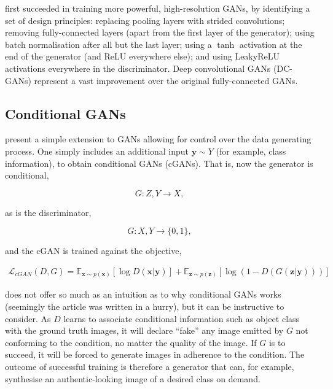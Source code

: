 \cite{radford2015unsupervised} first succeeded in training more powerful, high-resolution GANs, by identifying a set of design principles: replacing pooling layers with strided convolutions; removing fully-connected layers (apart from the first layer of the generator); using batch normalisation after all but the last layer; using a $\tanh$ activation at the end of the generator (and ReLU everywhere else); and using LeakyReLU activations everywhere in the discriminator. Deep convolutional GANs (DC-GANs) represent a vast improvement over the original fully-connected GANs.

\subsection{Conditional GANs}

\cite{mirza2014conditional} present a simple extension to GANs allowing for control over the data generating process. One simply includes an additional input $\mathbf{y} \sim Y$ (for example, class information), to obtain conditional GANs (cGANs). That is, now the generator is conditional,

\begin{equation}
G : Z, Y \to X,
\end{equation}

as is the discriminator,

\begin{equation}
G : X, Y \to \{0, 1\},
\end{equation}

and the cGAN is trained against the objective,

\begin{align}\mathcal{L}_{cGAN}(D, G) = \mathbb{E}_{\mathbf{x} \sim p(\mathbf{x})}[\log D(\mathbf{x} | \mathbf{y})] + \mathbb{E}_{\mathbf{z} \sim p(\mathbf{z})}[\log(1 - D(G(\mathbf{z} | \mathbf{y})))]
\end{align}

\cite{mirza2014conditional} does not offer so much as an intuition as to why conditional GANs works (seemingly the article was written in a hurry), but it can be instructive to consider. As $D$ learns to associate conditional information such as object class with the ground truth images, it will declare ``fake'' any image emitted by $G$ not conforming to the condition, no matter the quality of the image. If $G$ is to succeed, it will be forced to generate images in adherence to the condition. The outcome of successful training is therefore a generator that can, for example, synthesise an authentic-looking image of a desired class on demand.

